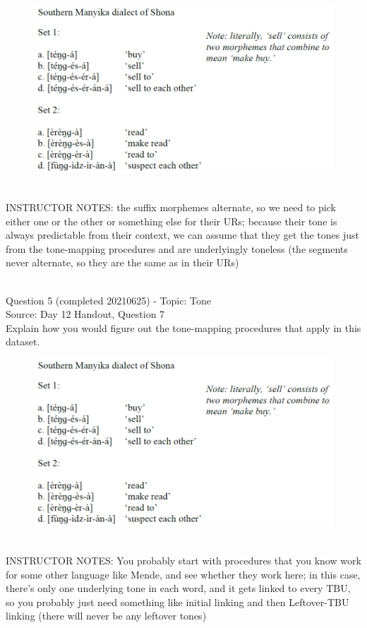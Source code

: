\documentclass[12pt]{article}
\begin{document}
\begin{figure}[H]
\includegraphics{../images/shona.png}
\end{figure}

~\\
INSTRUCTOR NOTES: the suffix morphemes alternate, so we need to pick either one or the other or something else for their URs; because their tone is always predictable from their context, we can assume that they get the tones just from the tone-mapping procedures and are underlyingly toneless (the segments never alternate, so they are the same as in their URs)


~\\

{\large Question 5} (completed 20210625) - Topic: Tone\\
Source: Day 12 Handout, Question 7\\

Explain how you would figure out the tone-mapping procedures that apply in this dataset.\\

\begin{figure}[H]
\includegraphics{../images/shona.png}
\end{figure}

~\\
INSTRUCTOR NOTES: You probably start with procedures that you know work for some other language like Mende, and see whether they work here; in this case, there's only one underlying tone in each word, and it gets linked to every TBU, so you probably just need something like initial linking and then Leftover-TBU linking (there will never be any leftover tones)


\newpage
\end{document}
